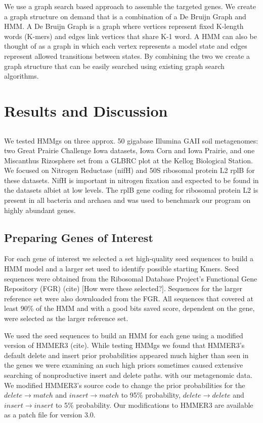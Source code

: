 \documentclass[10pt]{bmc_article}
\newenvironment{bmcformat}{\begin{raggedright}\baselineskip20pt\sloppy\setboolean{publ}{false}}{\end{raggedright}\baselineskip20pt\sloppy}
\begin{document}
\begin{bmcformat}
We use a graph search based approach to assemble the targeted genes.  We create a graph structure on demand that is a combination of a De Bruijn Graph and HMM.  A De Bruijn Graph is a graph where vertices represent fixed K-length words (K-mers) and edges link vertices that share K-1 word.  A HMM can also be thought of as a graph in which each vertex represents a model state and edges represent allowed transitions between states.  By combining the two we create a graph structure that can be easily searched using existing graph search algorithms.

 
\section*{Results and Discussion}
\subsection*{}
We tested HMMgs on three approx. 50 gigabase Illumina GAII soil metagenomes: two Great Prairie Challenge Iowa datasets, Iowa Corn and Iowa Prairie, and one Miscanthus Rizosphere set from a GLBRC plot at the Kellog Biological Station. We focused on Nitrogen Reductase (nifH) and 50S ribosomal protein L2 rplB for these datasets.  NifH is important in nitrogen fixation and expected to be found in the datasets albiet at low levels. The rplB gene coding for ribosomal protein L2 is present in all bacteria and archaea and was used to benchmark our program on highly abundant genes.

\subsection*{Preparing Genes of Interest}
For each gene of interest we selected a set high-quality seed sequences to build a HMM model and a larger set used to identify possible starting Kmers.  Seed sequences were obtained from the Ribosomal Database Project's Functional Gene Repository (FGR) (cite) [How were these selected?].  Sequences for the larger reference set were also downloaded from the FGR.  All sequences that covered at least 90\% of the HMM and with a good bits saved score, dependent on the gene, were selected as the larger reference set.

We used the seed sequences to build an HMM for each gene using a modified version of HMMER3 (cite). While testing HMMgs we found that HMMER3's default delete and insert prior probabilities appeared much higher than seen in the genes we were examining an such high priors sometimes caused extensive searching of nonproductive insert and delete paths. with our metagenomic data. We modified HMMER3's source code to change the prior probabilities for the $delete \rightarrow match$ and $insert \rightarrow match$ to 95\% probability, $delete \rightarrow delete$ and $insert \rightarrow insert$ to 5\% probability.  Our modifications to HMMER3 are available as a patch file for version 3.0.


\end{bmcformat}
\end{document}
